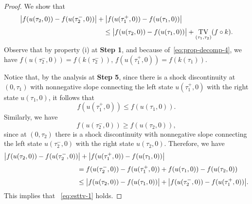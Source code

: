 \documentclass[a4paper, 10pt, final]{article}
\DeclareMathOperator{\tv}{TV}
\begin{document}
\begin{proof}
  We show that 
  \begin{equation}
  \label{eq:esttv-1}
  \begin{aligned}
      &\big|f(u(\tau_{2},0))-f(  u(\tau_{2}^-,0))\big|
      +\big|f(u(\tau_{1}^+,0))-f(u(\tau_{1},0))\big|
      \\
      \noalign{\smallskip}
      &\hspace{1.7in} \leq \big|f( u(\tau_{2},0))-f(u(\tau_{1},0))\big|
      + \tv_{(\tau_{1}, \tau_{2})} (f\circ k).
  \end{aligned}
  \end{equation}
  Observe that by property (i) at  {\bf Step 1}, and because of~\eqref{eq:prop-decomp-4}, 
  we have $f(u(\tau_{2}^-,0))=f(k(\tau_{2}^-))$,
  $f(u(\tau_{1}^+,0))=f(k(\tau_{1}))$.

  Notice that, by the analysis at   {\bf Step 5}, since there is a shock discontinuity at $(0,\tau_1)$ with nonnegative slope connecting the left state $u(\tau_1^+,0)$ with the right state $u(\tau_1,0)$, it follows that 
  \begin{equation}
  \label{fluxineq_1}
      f(u(\tau_1^+,0)) \leq f(u(\tau_1,0)).
  \end{equation}
  Similarly, we have
  \begin{equation}
  \label{fluxineq_2}
      f(u(\tau_2^-,0)) \geq f(u(\tau_2,0)),
  \end{equation}
  since at $(0,\tau_2)$
  there is a shock discontinuity with nonnegative slope connecting the left state $u(\tau_2^-,0)$ with the right state $u(\tau_2,0)$.
  Therefore, we have 
  \begin{equation*}
  \label{eq:esttv-2}
  \begin{aligned}
      &\big|f(u(\tau_{2},0))-f(  u(\tau_{2}^-,0))\big|
      +\big|f(u(\tau_{1}^+,0))-f(u(\tau_{1},0))\big|
      \\
      \noalign{\smallskip}
      &\hspace{1.5in} = f( u(\tau_{2}^-,0))-f(u(\tau_{1}^+,0))
      + f( u(\tau_{1},0))-f(u(\tau_{2},0))
      \\
      \noalign{\smallskip}
      &\hspace{1.5in} \leq \big|f( u(\tau_{2},0))-f(u(\tau_{1},0))\big|
      + \big|f( u(\tau_{2}^-,0))-f(u(\tau_{1}^+,0))\big|.
  \end{aligned}
  \end{equation*}
  This implies that ~\eqref{eq:esttv-1} holds.

\end{proof}
\end{document}
